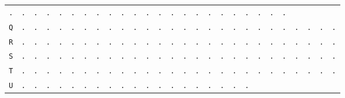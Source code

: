 \begin{figure}[H]
\begin{center}
{\begin{tabular}{c|cccccccccccccccccccccccccc}
        \texttt{.} & \texttt{.} & \texttt{.} & \texttt{.} &
        \texttt{.} & \texttt{.} & \texttt{.} & \texttt{.} &
        \texttt{.} & \texttt{.} & \texttt{.} & \texttt{.} &
        \texttt{.} & \texttt{.} & \texttt{.} & \texttt{.} &
        \texttt{.} & \texttt{.} & \texttt{.} & \texttt{.} &
        \texttt{.} & \texttt{.} & \texttt{.}                             \\
        \texttt{Q} & \texttt{.} & \texttt{.} & \texttt{.} &
        \texttt{.} & \texttt{.} & \texttt{.} & \texttt{.} &
        \texttt{.} & \texttt{.} & \texttt{.} & \texttt{.} &
        \texttt{.} & \texttt{.} & \texttt{.} & \texttt{.} &
        \texttt{.} & \texttt{.} & \texttt{.} & \texttt{.} &
        \texttt{.} & \texttt{.} & \texttt{.} & \texttt{.} &
        \texttt{.} & \texttt{.} & \texttt{.}                             \\
        \texttt{R} & \texttt{.} & \texttt{.} & \texttt{.} &
        \texttt{.} & \texttt{.} & \texttt{.} & \texttt{.} &
        \texttt{.} & \texttt{.} & \texttt{.} & \texttt{.} &
        \texttt{.} & \texttt{.} & \texttt{.} & \texttt{.} &
        \texttt{.} & \texttt{.} & \texttt{.} & \texttt{.} &
        \texttt{.} & \texttt{.} & \texttt{.} & \texttt{.} &
        \texttt{.} & \texttt{.} & \texttt{.}                             \\
        \texttt{S} & \texttt{.} & \texttt{.} & \texttt{.} &
        \texttt{.} & \texttt{.} & \texttt{.} & \texttt{.} &
        \texttt{.} & \texttt{.} & \texttt{.} & \texttt{.} &
        \texttt{.} & \texttt{.} & \texttt{.} & \texttt{.} &
        \texttt{.} & \texttt{.} & \texttt{.} & \texttt{.} &
        \texttt{.} & \texttt{.} & \texttt{.} & \texttt{.} &
        \texttt{.} & \texttt{.} & \texttt{.}                             \\
        \texttt{T} & \texttt{.} & \texttt{.} & \texttt{.} &
        \texttt{.} & \texttt{.} & \texttt{.} & \texttt{.} &
        \texttt{.} & \texttt{.} & \texttt{.} & \texttt{.} &
        \texttt{.} & \texttt{.} & \texttt{.} & \texttt{.} &
        \texttt{.} & \texttt{.} & \texttt{.} & \texttt{.} &
        \texttt{.} & \texttt{.} & \texttt{.} & \texttt{.} &
        \texttt{.} & \texttt{.} & \texttt{.}                             \\
        \texttt{U} & \texttt{.} & \texttt{.} & \texttt{.} &
        \texttt{.} & \texttt{.} & \texttt{.} & \texttt{.} &
        \texttt{.} & \texttt{.} & \texttt{.} & \texttt{.} &
        \texttt{.} & \texttt{.} & \texttt{.} & \texttt{.} &
        \texttt{.} & \texttt{.} & \texttt{.} & \texttt{.} &

\end{tabular}}
\end{center}
\end{figure}
